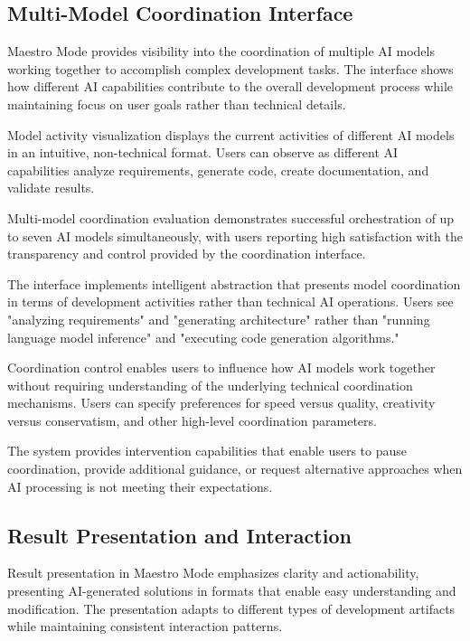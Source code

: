 \subsection*{Multi-Model Coordination Interface}

Maestro Mode provides visibility into the coordination of multiple AI models working together to accomplish complex development tasks. The interface shows how different AI capabilities contribute to the overall development process while maintaining focus on user goals rather than technical details.

Model activity visualization displays the current activities of different AI models in an intuitive, non-technical format. Users can observe as different AI capabilities analyze requirements, generate code, create documentation, and validate results.

\begin{successbox}
Multi-model coordination evaluation demonstrates successful orchestration of up to seven AI models simultaneously, with users reporting high satisfaction with the transparency and control provided by the coordination interface.
\end{successbox}

The interface implements intelligent abstraction that presents model coordination in terms of development activities rather than technical AI operations. Users see "analyzing requirements" and "generating architecture" rather than "running language model inference" and "executing code generation algorithms."

Coordination control enables users to influence how AI models work together without requiring understanding of the underlying technical coordination mechanisms. Users can specify preferences for speed versus quality, creativity versus conservatism, and other high-level coordination parameters.

The system provides intervention capabilities that enable users to pause coordination, provide additional guidance, or request alternative approaches when AI processing is not meeting their expectations.

\subsection*{Result Presentation and Interaction}

Result presentation in Maestro Mode emphasizes clarity and actionability, presenting AI-generated solutions in formats that enable easy understanding and modification. The presentation adapts to different types of development artifacts while maintaining consistent interaction patterns.

